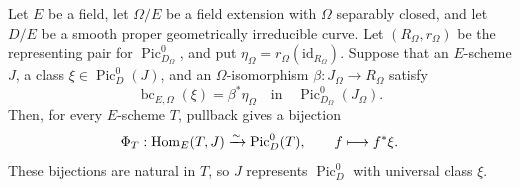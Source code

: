 \begin{theorem}
  \label{route-thm-field-descent-representability}
  \leanok

  Let \(E\) be a field, let \(\Omega/E\) be a field extension with
  \(\Omega\) separably closed, and let \(D/E\) be a smooth proper
  geometrically irreducible curve. Let \((R_\Omega,r_\Omega)\) be the
  representing pair for \(\operatorname{Pic}^0_{D_\Omega}\), and put
  \(\eta_\Omega=r_\Omega(\mathrm{id}_{R_\Omega})\). Suppose that an
  \(E\)-scheme \(J\), a class \(\xi\in\operatorname{Pic}^0_D(J)\),
  and an \(\Omega\)-isomorphism \(\beta:J_\Omega\to R_\Omega\)
  satisfy
  \[
    \operatorname{bc}_{E,\Omega}(\xi)=\beta^*\eta_\Omega
      \quad\text{in}\quad\operatorname{Pic}^0_{D_\Omega}(J_\Omega).
  \]
  Then, for every \(E\)-scheme \(T\), pullback gives a bijection
  \[
    \Phi_T:\operatorname{Hom}_E(T,J)\xrightarrow{\sim}\operatorname{Pic}^0_D(T),
    \qquad f\longmapsto f^*\xi.
  \]
  These bijections are natural in \(T\), so \(J\) represents
  \(\operatorname{Pic}^0_D\) with universal class \(\xi\).
\end{theorem}

